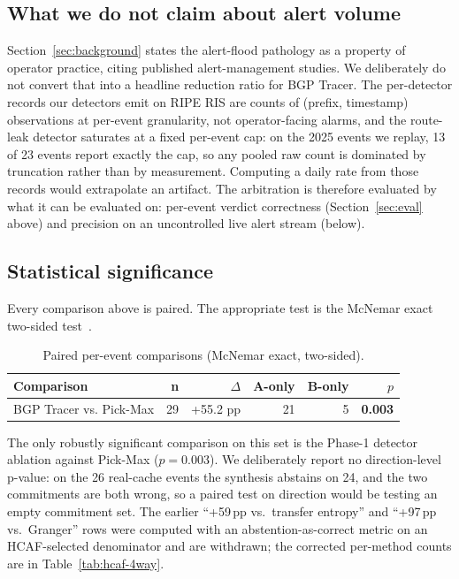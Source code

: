 \subsection{What we do not claim about alert volume}
Section~\ref{sec:background} states the alert-flood pathology as a property of operator practice, citing published alert-management studies. We deliberately do not convert that into a headline reduction ratio for BGP Tracer. The per-detector records our detectors emit on RIPE RIS are counts of (prefix, timestamp) observations at per-event granularity, not operator-facing alarms, and the route-leak detector saturates at a fixed per-event cap: on the 2025 events we replay, 13 of 23 events report exactly the cap, so any pooled raw count is dominated by truncation rather than by measurement. Computing a daily rate from those records would extrapolate an artifact. The arbitration is therefore evaluated by what it can be evaluated on: per-event verdict correctness (Section~\ref{sec:eval} above) and precision on an uncontrolled live alert stream (below).

\subsection{Statistical significance}
Every comparison above is paired. The appropriate test is the McNemar exact two-sided test~\cite{wilson-1927,efron-1979-bootstrap}.

\begin{table}[t]
\centering
\caption{Paired per-event comparisons (McNemar exact, two-sided).}
\label{tab:significance}
\small
\begin{tabular}{l r r r r r}
\hline
\textbf{Comparison} & \textbf{n} & \textbf{$\Delta$} & \textbf{A-only} & \textbf{B-only} & \textbf{$p$} \\
\hline
BGP Tracer vs. Pick-Max           & 29 & +55.2 pp & 21 &  5 & \textbf{0.003} \\
\hline
\end{tabular}
\end{table}

The only robustly significant comparison on this set is the Phase-1 detector ablation against Pick-Max ($p=0.003$). We deliberately report no direction-level p-value: on the 26 real-cache events the synthesis abstains on 24, and the two commitments are both wrong, so a paired test on direction would be testing an empty commitment set. The earlier ``+59\,pp vs.\ transfer entropy'' and ``+97\,pp vs.\ Granger'' rows were computed with an abstention-as-correct metric on an HCAF-selected denominator and are withdrawn; the corrected per-method counts are in Table~\ref{tab:hcaf-4way}.

